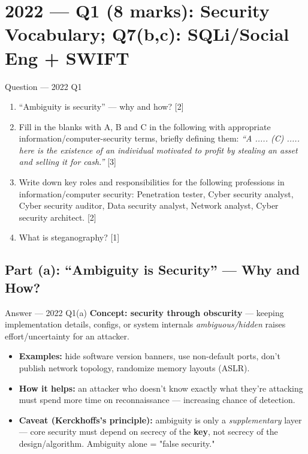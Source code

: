 \documentclass[12pt,a4paper]{article}
\begin{document}
\newpage
\section{2022 --- Q1 (8 marks): Security Vocabulary; Q7(b,c): SQLi/Social Eng + SWIFT}

\begin{qbox}{Question --- 2022 Q1}
\begin{enumerate}[label=(\alph*)]
  \item ``Ambiguity is security'' --- why and how? \hfill [2]
  \item Fill in the blanks with A, B and C in the following with appropriate information/computer-security terms, briefly defining them: \emph{``A ..... (C) ..... here is the existence of an individual motivated to profit by stealing an asset and selling it for cash.''} \hfill [3]
  \item Write down key roles and responsibilities for the following professions in information/computer security: Penetration tester, Cyber security analyst, Cyber security auditor, Data security analyst, Network analyst, Cyber security architect. \hfill [2]
  \item What is steganography? \hfill [1]
\end{enumerate}
\end{qbox}

\subsection{Part (a): ``Ambiguity is Security'' --- Why and How?}
\begin{solbox}{Answer --- 2022 Q1(a)}
\textbf{Concept: security through obscurity} --- keeping implementation details, configs, or system internals \emph{ambiguous/hidden} raises effort/uncertainty for an attacker.
\begin{itemize}[noitemsep]
  \item \textbf{Examples:} hide software version banners, use non-default ports, don't publish network topology, randomize memory layouts (ASLR).
  \item \textbf{How it helps:} an attacker who doesn't know exactly what they're attacking must spend more time on reconnaissance --- increasing chance of detection.
  \item \textbf{Caveat (Kerckhoffs's principle):} ambiguity is only a \emph{supplementary} layer --- core security must depend on secrecy of the \textbf{key}, not secrecy of the design/algorithm. Ambiguity alone = "false security."
\end{itemize}
\end{solbox}
\end{document}

